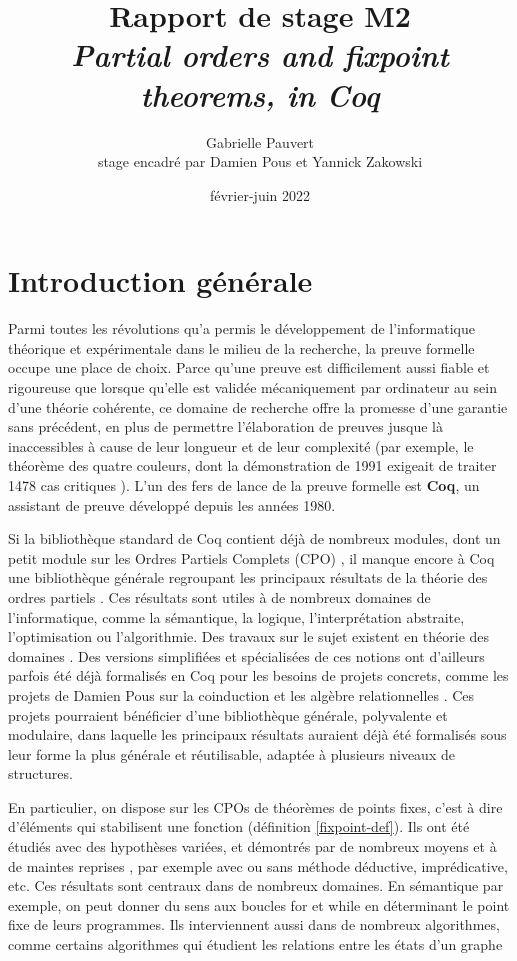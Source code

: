 \documentclass{article}
\title{Rapport de stage M2 \\ 
\textit{Partial orders and fixpoint theorems, in Coq}}
\date{février-juin 2022}
\author{Gabrielle Pauvert\\
stage encadré par Damien Pous et Yannick Zakowski}
\theoremstyle{definition}
\begin{document}
\maketitle

\section*{Introduction générale}

Parmi toutes les révolutions qu'a permis le développement de l'informatique théorique et expérimentale dans le milieu de la recherche, la preuve formelle occupe une place de choix. Parce qu'une preuve est difficilement aussi fiable et rigoureuse que lorsque qu'elle est validée mécaniquement par ordinateur au sein d'une théorie cohérente, ce domaine de recherche offre la promesse d'une garantie sans précédent, en plus de permettre l'élaboration de preuves jusque là inaccessibles à cause de leur longueur et de leur complexité (par exemple, le théorème des quatre couleurs, dont la démonstration de 1991 exigeait de traiter 1478 cas critiques \cite{4color}). L'un des fers de lance de la preuve formelle est \textbf{Coq}, un assistant de preuve développé depuis les années 1980.

Si la bibliothèque standard de Coq contient déjà de nombreux modules, dont un petit module sur les Ordres Partiels Complets (CPO) \cite{coqCPO}, il manque encore à Coq une bibliothèque générale regroupant les principaux résultats de la théorie des ordres partiels \cite{main}. Ces résultats sont utiles à de nombreux domaines de l'informatique, comme la sémantique, la logique, l'interprétation abstraite, l'optimisation ou l'algorithmie. Des travaux sur le sujet existent en théorie des domaines \cite{dockins}. Des versions simplifiées et spécialisées de ces notions ont d'ailleurs parfois été déjà formalisés en Coq pour les besoins de projets concrets, comme les projets de Damien Pous sur la coinduction \cite{coind-theory} %
et les algèbre relationnelles \cite{relalg}. Ces projets pourraient bénéficier d'une bibliothèque générale, polyvalente et modulaire, dans laquelle les principaux résultats auraient déjà été formalisés sous leur forme la plus générale et réutilisable, adaptée à plusieurs niveaux de structures.


En particulier, on dispose sur les CPOs de théorèmes de points fixes, c'est à dire d'éléments qui stabilisent une fonction (définition \ref{fixpoint-def}). Ils ont été étudiés avec des hypothèses variées, et démontrés par de nombreux moyens et à de maintes reprises \cite{main} \cite{proofs} \cite{ktnote}, par exemple avec ou sans méthode déductive, imprédicative, etc. Ces résultats sont centraux dans de nombreux domaines. En sémantique par exemple, on peut donner du sens aux boucles for et while en déterminant le point fixe de leurs programmes. Ils interviennent aussi dans de nombreux algorithmes, comme certains algorithmes qui étudient les relations entre les états d'un graphe
\end{document}
